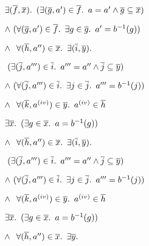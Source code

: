 \begin{itemize}
  \step[\iffs]
    $\exists (\overline{f},\overline{x})\ldotp~(\exists(\overline{g},a^\prime)\in\overline{f}\ldotp~a=a^\prime\land\overline{g}\subseteq\overline{x})$
    \marginnote{\Def-$\App$}

  \addtolength{\itemsep}{-.5\baselineskip}
  \step
    \quad $\land~(\forall (\overline{g},a^\prime)\in\overline{f}\ldotp~\exists g\in\overline{g}\ldotp~a^\prime = b^{-1}(g))$

  \step
    \quad $\land~\phantom{(}\forall(\overline{h},a^{\prime\prime})\in\overline{x}\ldotp~\exists(\overline{i},\overline{y})\ldotp$

  \step
    \quad\quad\quad\phantom{$\land$}$~(\exists (\overline{j},a^{\prime\prime\prime})\in\overline{i}\ldotp~a^{\prime\prime\prime} = a^{\prime\prime}\land\overline{j}\subseteq\overline{y})$
    \marginnote{\Def-$\App$}

  \step
    \quad\quad\quad$\land~(\forall (\overline{j},a^{\prime\prime\prime})\in\overline{i}\ldotp~\exists j\in\overline{j}\ldotp~a^{\prime\prime\prime}=b^{-1}(j))$

  \step
    \quad\quad\quad$\land~\phantom{(}\forall (\overline{k},a^{\text (iv)})\in\overline{y}\ldotp~a^{\text (iv)}\in\overline{h}$
  \addtolength{\itemsep}{.5\baselineskip}

  \step[\iffs]
    $\exists \overline{x}\ldotp~(\exists g\in\overline{x}\ldotp~a = b^{-1}(g))$

  \addtolength{\itemsep}{-.5\baselineskip}
  \step
    \quad $\land~\phantom{(}\forall(\overline{h},a^{\prime\prime})\in\overline{x}\ldotp~\exists(\overline{i},\overline{y})\ldotp$

  \step
    \quad\quad\quad\phantom{$\land$}$~(\exists (\overline{j},a^{\prime\prime\prime})\in\overline{i}\ldotp~a^{\prime\prime\prime} = a^{\prime\prime}\land\overline{j}\subseteq\overline{y})$

  \step
    \quad\quad\quad$\land~(\forall (\overline{j},a^{\prime\prime\prime})\in\overline{i}\ldotp~\exists j\in\overline{j}\ldotp~a^{\prime\prime\prime}=b^{-1}(j))$

  \step
    \quad\quad\quad$\land~\phantom{(}\forall (\overline{k},a^{\text (iv)})\in\overline{y}\ldotp~a^{\text (iv)}\in\overline{h}$
  \addtolength{\itemsep}{.5\baselineskip}

  \step[\iffs]
    $\exists \overline{x}\ldotp~(\exists g\in\overline{x}\ldotp~a = b^{-1}(g))$

  \addtolength{\itemsep}{-.5\baselineskip}
  \step
    \quad $\land~\phantom{(}\forall(\overline{h},a^{\prime\prime})\in\overline{x}\ldotp~\exists\overline{y}\ldotp$


\end{itemize}
